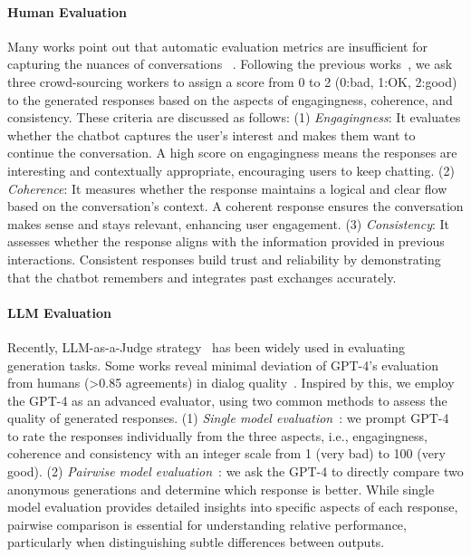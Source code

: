 \documentclass[authoryear,preprint,review,12pt]{elsarticle}
\begin{document}
\paragraph*{Human Evaluation} Many works point out that automatic evaluation metrics are insufficient for capturing the nuances of conversations ~\citep{Deriu2019SurveyOE}. Following the previous works~\citep{bae-etal-2022-keep}, we ask three crowd-sourcing workers to assign a score from 0 to 2 (0:bad, 1:OK, 2:good) to the generated responses based on the aspects of engagingness, coherence, and consistency. These criteria are discussed as follows: (1) \textit{Engagingness}: It evaluates whether the chatbot captures the user's interest and makes them want to continue the conversation. A high score on engagingness means the responses are interesting and contextually appropriate, encouraging users to keep chatting.
(2) \textit{Coherence}: It measures whether the response maintains a logical and clear flow based on the conversation's context. A coherent response ensures the conversation makes sense and stays relevant, enhancing user engagement. (3) \textit{Consistency}:
It assesses whether the response aligns with the information provided in previous interactions. Consistent responses build trust and reliability by demonstrating that the chatbot remembers and integrates past exchanges accurately.

\paragraph*{LLM Evaluation} Recently, LLM-as-a-Judge strategy~\citep{Pan2023DoTR} has been widely used in evaluating generation tasks. Some works reveal minimal deviation of GPT-4’s evaluation from humans (\textgreater0.85 agreements) in dialog quality~\citep{Zhang2023ACA}. Inspired by this, we employ the GPT-4 as an advanced evaluator, using two common methods to assess the quality of generated responses. (1) \textit{Single model evaluation}~\citep{Lu2023MemoChatTL}: we prompt GPT-4 to rate the responses individually from the three aspects, i.e., engagingness, coherence and consistency with an integer scale from 1 (very bad) to 100 (very good). (2) \textit{Pairwise model evaluation}~\citep{Dubois2023AlpacaFarmAS}: we ask the GPT-4 to directly compare two anonymous generations and determine which response is better. While single model evaluation provides detailed insights into specific aspects of each response, pairwise comparison is essential for understanding relative performance, particularly when distinguishing subtle differences between outputs.
\end{document}
